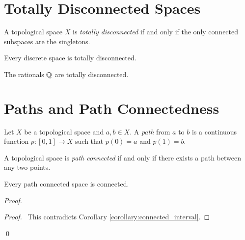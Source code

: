 \section{Totally Disconnected Spaces}

\begin{definition}
    A topological space $X$ is \emph{totally disconnected} if and only if the only connected subspaces are the singletons.
\end{definition}

\begin{example}
    Every discrete space is totally disconnected.
\end{example}

\begin{example}
    The rationals $\mathbb{Q}$ are totally disconnected.
\end{example}

\section{Paths and Path Connectedness}

\begin{definition}[Path]
    Let $X$ be a topological space and $a, b \in X$. A \emph{path} from $a$ to $b$ is a continuous function $p : [0,1] \rightarrow X$
    such that $p(0) = a$ and $p(1) = b$.
\end{definition}

\begin{definition}
    A topological space is \emph{path connected} if and only if there exists a path between any two points.
\end{definition}

\begin{proposition}
    \label{proposition:connected_path_connected}
    Every path connected space is connected.
\end{proposition}

\begin{proof}
    \pf
    \qedstep
    \begin{proof}
        \pf\ This contradicts Corollary \ref{corollary:connected_interval}.
    \end{proof}
    \qed
\end{proof}

